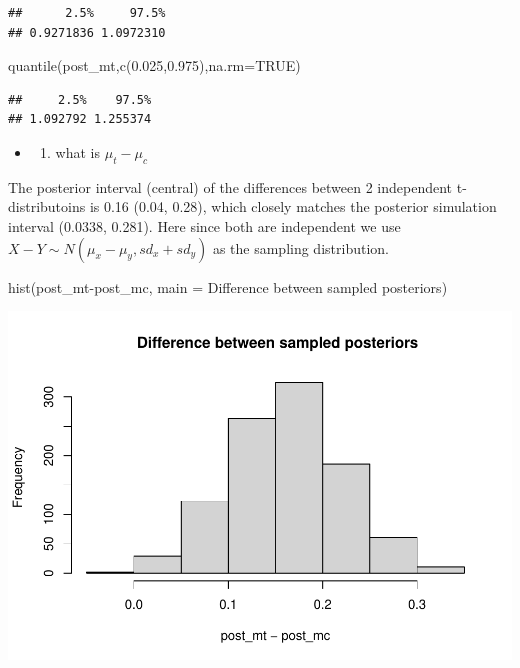 \documentclass[
]{book}
\newenvironment{Shaded}{\begin{snugshade}}{\end{snugshade}}
\newcommand{\AttributeTok}[1]{\textcolor[rgb]{0.77,0.63,0.00}{#1}}
\newcommand{\ConstantTok}[1]{\textcolor[rgb]{0.00,0.00,0.00}{#1}}
\newcommand{\FloatTok}[1]{\textcolor[rgb]{0.00,0.00,0.81}{#1}}
\newcommand{\FunctionTok}[1]{\textcolor[rgb]{0.00,0.00,0.00}{#1}}
\newcommand{\NormalTok}[1]{#1}
\newcommand{\SpecialCharTok}[1]{\textcolor[rgb]{0.00,0.00,0.00}{#1}}
\newcommand{\StringTok}[1]{\textcolor[rgb]{0.31,0.60,0.02}{#1}}
\providecommand{\tightlist}{%
  \setlength{\itemsep}{0pt}\setlength{\parskip}{0pt}}
\theoremstyle{definition}
\theoremstyle{definition}
\theoremstyle{definition}
\theoremstyle{definition}
\theoremstyle{remark}
\begin{document}
\begin{verbatim}
##      2.5%     97.5% 
## 0.9271836 1.0972310
\end{verbatim}

\begin{Shaded}
\begin{Highlighting}[]
        \FunctionTok{quantile}\NormalTok{(post\_mt,}\FunctionTok{c}\NormalTok{(}\FloatTok{0.025}\NormalTok{,}\FloatTok{0.975}\NormalTok{),}\AttributeTok{na.rm=}\ConstantTok{TRUE}\NormalTok{)}
\end{Highlighting}
\end{Shaded}

\begin{verbatim}
##     2.5%    97.5% 
## 1.092792 1.255374
\end{verbatim}

\begin{itemize}
\item
  \begin{enumerate}
  \def\labelenumi{(\alph{enumi})}
  \setcounter{enumi}{1}
  \tightlist
  \item
    what is \(\mu_t - \mu_c\)
  \end{enumerate}
\end{itemize}

The posterior interval (central) of the differences between 2 independent t-distributoins is 0.16 (0.04, 0.28), which closely matches the posterior simulation interval (0.0338, 0.281). Here since both are independent we use \(X-Y\sim N(\mu_x-\mu_y, sd_x+sd_y)\) as the sampling distribution.

\begin{Shaded}
\begin{Highlighting}[]
 \FunctionTok{hist}\NormalTok{(post\_mt}\SpecialCharTok{{-}}\NormalTok{post\_mc, }\AttributeTok{main =} \StringTok{\textquotesingle{} Difference between sampled posteriors\textquotesingle{}}\NormalTok{)}
\end{Highlighting}
\end{Shaded}

\includegraphics{_main_files/figure-latex/unnamed-chunk-32-1.pdf}
\end{document}
